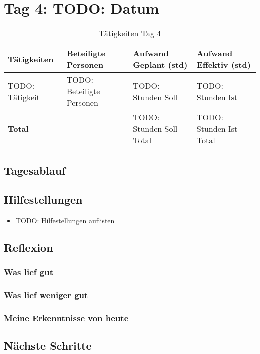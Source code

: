 \section{Tag 4: TODO: Datum}
\begin{table}[H]
    \begin{tabular}{|L{0.4\textwidth}|C{60pt}|C{60pt}|C{60pt}|}
        \hline
        \color{white}Tätigkeiten & \color{white}Beteiligte \color{white}Personen & \color{white}Aufwand Geplant (std) & \color{white}Aufwand Effektiv (std) \\
        \hline
        TODO: Tätigkeit & TODO: Beteiligte Personen & TODO: Stunden Soll & TODO: Stunden Ist \\
        \hline
        \textbf{Total} & & TODO: Stunden Soll Total & TODO: Stunden Ist Total \\
        \hline
    \end{tabular}
    \caption{Tätigkeiten Tag 4}
\end{table}

\subsection*{Tagesablauf}


\subsection*{Hilfestellungen}
\begin{itemize}
    \item TODO: Hilfestellungen auflisten
\end{itemize}

\subsection*{Reflexion}
\subsubsection*{Was lief gut}

\subsubsection*{Was lief weniger gut}

\subsubsection*{Meine Erkenntnisse von heute}

\subsection*{Nächste Schritte}

\pagebreak

